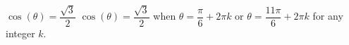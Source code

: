 {$\cos(\theta) = \dfrac{\sqrt{3}}{2}$}
{$\cos(\theta) = \dfrac{\sqrt{3}}{2}$ when $\theta = \dfrac{\pi}{6} + 2\pi k$ or  $\theta = \dfrac{11\pi}{6} + 2\pi k$ for any integer $k$.}
